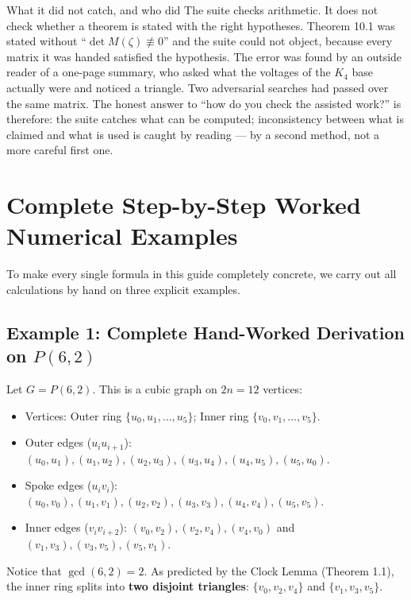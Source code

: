 \documentclass[11pt]{article}
\begin{document}
\begin{callbox}{What it did not catch, and who did}
The suite checks arithmetic. It does not check whether a theorem is stated with the right hypotheses. Theorem 10.1 was stated without ``$\det M(\zeta)\not\equiv0$'' and the suite could not object, because every matrix it was handed satisfied the hypothesis. The error was found by an outside reader of a one-page summary, who asked what the voltages of the $K_4$ base actually were and noticed a triangle. Two adversarial searches had passed over the same matrix. The honest answer to ``how do you check the assisted work?'' is therefore: the suite catches what can be computed; inconsistency between what is claimed and what is used is caught by reading --- by a second method, not a more careful first one.
\end{callbox}

\newpage
\section{Complete Step-by-Step Worked Numerical Examples}

To make every single formula in this guide completely concrete, we carry out all calculations by hand on three explicit examples.

\subsection{Example 1: Complete Hand-Worked Derivation on $P(6,2)$}

Let $G = P(6,2)$. This is a cubic graph on $2n = 12$ vertices:
\begin{itemize}[leftmargin=*,nosep]
  \item Vertices: Outer ring $\{u_0, u_1, \dots, u_5\}$; Inner ring $\{v_0, v_1, \dots, v_5\}$.
  \item Outer edges ($u_i u_{i+1}$): $(u_0, u_1), (u_1, u_2), (u_2, u_3), (u_3, u_4), (u_4, u_5), (u_5, u_0)$.
  \item Spoke edges ($u_i v_i$): $(u_0, v_0), (u_1, v_1), (u_2, v_2), (u_3, v_3), (u_4, v_4), (u_5, v_5)$.
  \item Inner edges ($v_i v_{i+2}$): $(v_0, v_2), (v_2, v_4), (v_4, v_0)$ and $(v_1, v_3), (v_3, v_5), (v_5, v_1)$.
\end{itemize}
Notice that $\gcd(6, 2) = 2$. As predicted by the Clock Lemma (Theorem 1.1), the inner ring splits into \textbf{two disjoint triangles}: $\{v_0, v_2, v_4\}$ and $\{v_1, v_3, v_5\}$.
\end{document}
